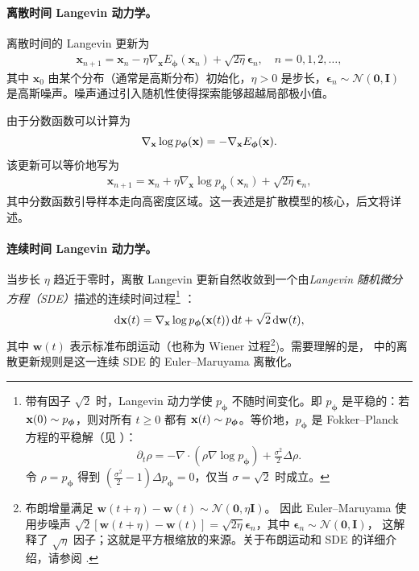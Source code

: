 \paragraph{离散时间 Langevin 动力学。}
离散时间的 Langevin 更新为
\begin{align}\label{eq:discrete-langevin}
    \mathbf{x}_{n+1} = \mathbf{x}_n - \eta \nabla_{\mathbf{x}} E_{\bm{\phi}}(\mathbf{x}_n) +  \sqrt{2 \eta} \bm{\epsilon}_n, \quad n=0,1,2,\ldots,
\end{align}
其中 $\mathbf{x}_0$ 由某个分布（通常是高斯分布）初始化，$\eta > 0$ 是步长，$\bm{\epsilon}_n \sim \mathcal{N}(\mathbf{0}, \mathbf{I})$ 是高斯噪声。噪声通过引入随机性使得探索能够超越局部极小值。

由于分数函数可以计算为
\[
\nabla_{\mathbf{x}} \log p_{\bm{\phi}}(\mathbf{x}) = -\nabla_{\mathbf{x}} E_{\bm{\phi}}({\mathbf{x}}).
\]
该更新可以等价地写为
\begin{align}\label{eq:discrete-langevin-score}
    \mathbf{x}_{n+1} = \mathbf{x}_n + \eta \nabla_{\mathbf{x}} \log p_{\bm{\phi}}(\mathbf{x}_n) + \sqrt{2 \eta}\bm{\epsilon}_n,
\end{align}
其中分数函数引导样本走向高密度区域。这一表述是扩散模型的核心，后文将详述。

\paragraph{连续时间 Langevin 动力学。}
当步长 $\eta$ 趋近于零时，离散 Langevin 更新自然收敛到一个由\emph{Langevin 随机微分方程（SDE）}描述的连续时间过程\footnote{
带有因子 $\sqrt{2}$ 时，Langevin 动力学使 $p_{\bm\phi}$ 不随时间变化。即 $p_{\bm\phi}$ 是平稳的：若 ${\mathbf{x}}(0)\sim p_{\bm\phi}$，则对所有 $t\ge 0$ 都有 ${\mathbf{x}}(t)\sim p_{\bm\phi}$。等价地，$p_{\bm\phi}$ 是 Fokker–Planck 方程的平稳解（见 ）：
\[
\partial_t \rho = -\nabla \cdot(\rho  \nabla\log p_{\bm\phi}) + \tfrac{\sigma^2}{2}\Delta \rho.
\]
令 $\rho=p_{\bm\phi}$ 得到 $(\tfrac{\sigma^2}{2}-1)\Delta p_{\bm\phi}=0$，仅当 $\sigma=\sqrt{2}$ 时成立。
}
：
\begin{align}\label{eq:continuous-langevin}
 \mathop{}\!\mathrm{d} \mathbf{x}(t) = \nabla_{\mathbf{x}} \log p_{\bm{\phi}}(\mathbf{x}(t)) \mathop{}\!\mathrm{d} t + \sqrt{2} \mathop{}\!\mathrm{d} \mathbf{w}(t),
\end{align}
其中 $\mathbf{w}(t)$ 表示标准布朗运动（也称为 Wiener 过程\footnote{布朗增量满足
$\mathbf{w}(t+\eta)-\mathbf{w}(t)\sim \mathcal{N}(\mathbf{0},  \eta  \mathbf{I})$。
因此 Euler–Maruyama 使用步噪声 $\sqrt{2}  [\mathbf{w}(t+\eta)-\mathbf{w}(t)]
= \sqrt{2\eta}  \bm{\epsilon}_n$，其中 $\bm{\epsilon}_n \sim \mathcal{N}(\mathbf{0},\mathbf{I})$，
这解释了 $\sqrt{\eta}$ 因子；这就是平方根缩放的来源。关于布朗运动和 SDE 的详细介绍，请参阅 .})。需要理解的是， 中的离散更新规则是这一连续 SDE 的 Euler–Maruyama 离散化。


